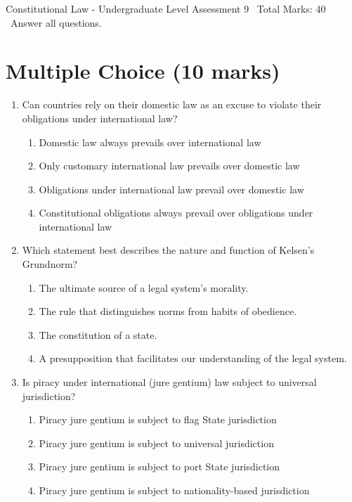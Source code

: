 \documentclass[12pt]{article}
\begin{document}
\begin{center}
Constitutional Law - Undergraduate Level Assessment 9 \
Total Marks: 40 \
Answer all questions.
\end{center}

\section*{Multiple Choice (10 marks)}
\begin{enumerate}[label=\arabic*.]
\item Can countries rely on their domestic law as an excuse to violate their obligations under international law?
\begin{enumerate}[label=(\alph*)]
    \item Domestic law always prevails over international law
    \item Only customary international law prevails over domestic law
    \item Obligations under international law prevail over domestic law
    \item Constitutional obligations always prevail over obligations under international law
\end{enumerate}
\item Which statement best describes the nature and function of Kelsen's Grundnorm?
\begin{enumerate}[label=(\alph*)]
    \item The ultimate source of a legal system's morality.
    \item The rule that distinguishes norms from habits of obedience.
    \item The constitution of a state.
    \item A presupposition that facilitates our understanding of the legal system.
\end{enumerate}
\item Is piracy under international (jure gentium) law subject to universal jurisdiction?
\begin{enumerate}[label=(\alph*)]
    \item Piracy jure gentium is subject to flag State jurisdiction
    \item Piracy jure gentium is subject to universal jurisdiction
    \item Piracy jure gentium is subject to port State jurisdiction
    \item Piracy jure gentium is subject to nationality-based jurisdiction
\end{enumerate}

\end{enumerate}
\end{document}
